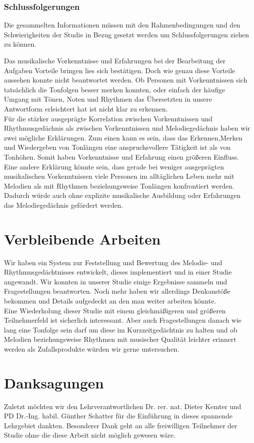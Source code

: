 \documentclass{acm_proc_article-sp}
\begin{document}
\subsubsection{Schlussfolgerungen}
Die gesammelten Informationen müssen mit den Rahmenbedingungen und den Schwierigkeiten der Studie in Bezug gesetzt werden um Schlussfolgerungen ziehen zu können.

Das musikalische Vorkenntnisse und Erfahrungen bei der Bearbeitung der Aufgaben Vorteile bringen lies sich bestätigen. Doch wie genau diese Vorteile aussehen konnte nicht beantwortet werden. Ob Personen mit Vorkenntnissen sich tatsächlich die Tonfolgen besser merken konnten, oder einfach der häufige Umgang mit Tönen, Noten und Rhythmen das Übersetzten in unsere Antwortform erleichtert hat ist nicht klar zu erkennen.\\
Für die stärker ausgeprägte Korrelation zwischen Vorkenntnissen und Rhythmusgedächnis als zwischen Vorkenntnissen und Melodiegedächnis haben wir zwei mögliche Erklärungen. Zum einen kann es sein, dass das Erkennen,Merken und Wiedergeben von Tonlängen eine anspruchsvollere Tätigkeit ist als von Tonhöhen. Somit haben Vorkenntnisse und Erfahrung einen größeren Einfluss. \\
Eine andere Erklärung könnte sein, dass gerade bei weniger ausgeprägten musikalischen Vorkenntnissen viele Personen im alltäglichen Leben mehr mit Melodien als mit Rhythmen beziehungsweise Tonlängen konfrontiert werden. Dadurch würde auch ohne explizite musikalische Ausbildung oder Erfahrungen das Melodiegedächnis gefördert werden.\\

\section{Verbleibende Arbeiten}
Wir haben ein System zur Feststellung und Bewertung des Melodie- und Rhythmusgedächtnisses entwickelt, dieses implementiert und in einer Studie angewandt.  
Wir konnten in unserer Studie einige Ergebnisse sammeln und Fragestellungen beantworten. Noch mehr haben wir allerdings Denkanstöße bekommen und Details aufgedeckt an den man weiter arbeiten könnte.\\
Eine Wiederholung dieser Studie mit einem gleichmäßigeren und größeren Teilnehmerfeld ist sicherlich interessant. Aber auch Fragestellungen danach wie lang eine Tonfolge sein darf um diese im Kurzzeitgedächtnis zu halten und ob Melodien beziehungsweise Rhythmen mit musischer Qualität leichter erinnert werden als Zufallsprodukte würden wir gerne untersuchen.

\section{Danksagungen}
Zuletzt möchten wir den Lehrverantwortlichen Dr. rer. nat. Dieter Kemter und PD Dr.-Ing. habil. Günther Schatter für die Einführung in dieses spannende Lehrgebiet dankten. Besonderer Dank geht an alle freiwilligen Teilnehmer der Studie ohne die diese Arbeit nicht möglich gewesen wäre.

\printbibliography
\end{document}
